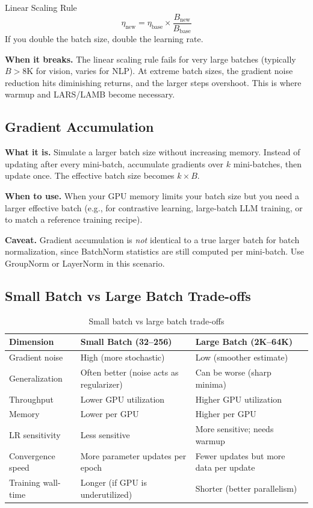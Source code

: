 \begin{mathresult}{Linear Scaling Rule}
\begin{equation}
\eta_{\text{new}} = \eta_{\text{base}} \times \frac{B_{\text{new}}}{B_{\text{base}}}
\end{equation}
If you double the batch size, double the learning rate.
\end{mathresult}

\textbf{When it breaks.} The linear scaling rule fails for very large batches (typically $B > 8\text{K}$ for vision, varies for NLP). At extreme batch sizes, the gradient noise reduction hits diminishing returns, and the larger steps overshoot. This is where warmup and LARS/LAMB become necessary.

\subsection{Gradient Accumulation}

\textbf{What it is.} Simulate a larger batch size without increasing memory. Instead of updating after every mini-batch, accumulate gradients over $k$ mini-batches, then update once. The effective batch size becomes $k \times B$.

\textbf{When to use.} When your GPU memory limits your batch size but you need a larger effective batch (e.g., for contrastive learning, large-batch LLM training, or to match a reference training recipe).

\textbf{Caveat.} Gradient accumulation is \textit{not} identical to a true larger batch for batch normalization, since BatchNorm statistics are still computed per mini-batch. Use GroupNorm or LayerNorm in this scenario.

\subsection{Small Batch vs Large Batch Trade-offs}

\begin{table}[H]
\centering
\caption{Small batch vs large batch trade-offs}
\begin{tabularx}{\textwidth}{lXX}
\toprule
\textbf{Dimension} & \textbf{Small Batch (32--256)} & \textbf{Large Batch (2K--64K)} \\
\midrule
Gradient noise & High (more stochastic) & Low (smoother estimate) \\
Generalization & Often better (noise acts as regularizer) & Can be worse (sharp minima) \\
Throughput & Lower GPU utilization & Higher GPU utilization \\
Memory & Lower per GPU & Higher per GPU \\
LR sensitivity & Less sensitive & More sensitive; needs warmup \\
Convergence speed & More parameter updates per epoch & Fewer updates but more data per update \\
Training wall-time & Longer (if GPU is underutilized) & Shorter (better parallelism) \\
\bottomrule
\end{tabularx}
\end{table}

